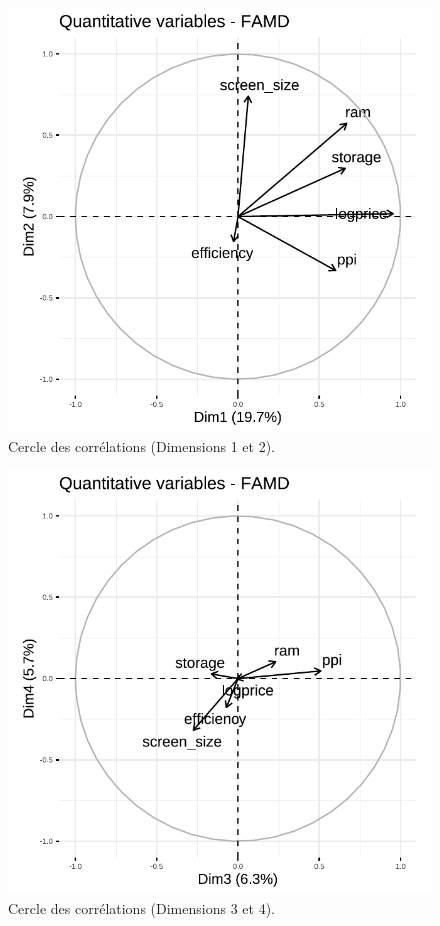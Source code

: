 \documentclass[
  12pt,
]{report}
\begin{document}
\begin{figure}[H]

{\centering \includegraphics{report_files/figure-pdf/unnamed-chunk-13-1.pdf}

}

\caption{Cercle des corrélations (Dimensions 1 et 2).}

\end{figure}%

\begin{figure}[H]

{\centering \includegraphics{report_files/figure-pdf/unnamed-chunk-14-1.pdf}

}

\caption{Cercle des corrélations (Dimensions 3 et 4).}

\end{figure}%
\end{document}
